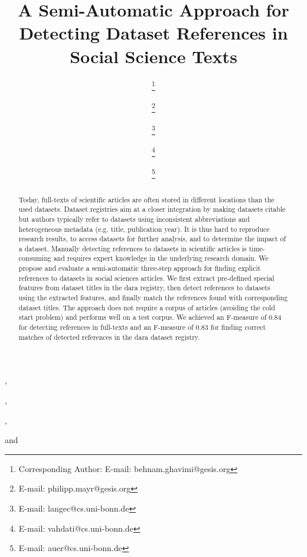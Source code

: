 \documentclass{IOS-Book-Article}
\newcommand{\dara}{\textsf{da\textbar ra}}
\begin{document}
\pagestyle{headings}
\def\thepage{}

\begin{frontmatter}
\title{A Semi-Automatic Approach for Detecting Dataset References in Social Science Texts}
\author[A,B]{ 
\thanks{Corresponding Author: E-mail: behnam.ghavimi@gesis.org}},
\author[A]{ 
\thanks{E-mail: philipp.mayr@gesis.org}},
\author[B,C]{  
\thanks{E-mail: langec@cs.uni-bonn.de}},
\author[B]{ 
\thanks{E-mail: vahdati@cs.uni-bonn.de}}
and
\author[B,C]{  
\thanks{E-mail: auer@cs.uni-bonn.de}}

\address[A]{GESIS – Leibniz Institute for the Social Sciences}
\address[B]{Enterprise Information Systems (EIS), University of Bonn}
\address[C]{Fraunhofer Institute for Intelligent Analysis and Information Systems IAIS}
\begin{abstract}
Today, full-texts of scientific articles are often stored in different locations than the used datasets.
Dataset registries aim at a closer integration by making datasets citable 
but authors typically refer to datasets using inconsistent abbreviations and heterogeneous metadata (e.g. title, publication year).
It is thus hard to reproduce research results, to access datasets for further analysis, and to determine the impact of a dataset.
Manually detecting references to datasets in scientific articles is time-consuming and requires expert knowledge in the underlying research domain. 
We propose and evaluate a semi-automatic three-step approach for finding explicit references to datasets in social sciences articles.
We first extract pre-defined special features from dataset titles in the {\dara} registry, then detect references to datasets using the extracted features, and finally match the references found with corresponding dataset titles.
The approach does not require a corpus of articles (avoiding the cold start problem) and performs well on a test corpus. 
We achieved an F-measure of 0.84 for detecting references in full-texts and an F-measure of 0.83 for finding correct matches of detected references in the {\dara} dataset registry.


\end{abstract}
\end{frontmatter}
\end{document}
